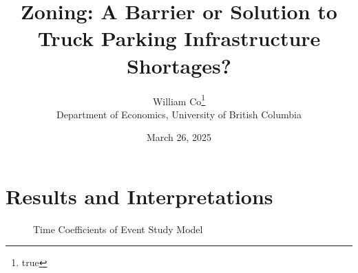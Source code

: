 \documentclass[
  8pt,
  12pt]{article}
\begin{document}
\def\spacingset#1{\renewcommand{\baselinestretch}%
{#1}\small\normalsize} \spacingset{1}



\date{March 26, 2025}
\title{\bf Zoning: A Barrier or Solution to Truck Parking Infrastructure
Shortages?}
\author{
William Co\thanks{true}\\
Department of Economics, University of British Columbia\\
}
\maketitle

\bigskip
\bigskip
\begin{abstract}

\end{abstract}


\newpage
\spacingset{1.9} %

\section{Results and Interpretations}\label{results-and-interpretations}

\begin{figure}


\caption{\label{fig-time}Time Coefficients of Event Study Model}

\end{figure}%
\end{document}
